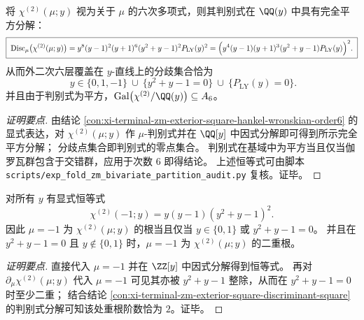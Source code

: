 \begin{conclusion}[外二次判别式的完全平方分解与二阶共振临界集]\label{con:xi-terminal-zm-exterior-square-discriminant-square}
将 \(\chi^{(2)}(\mu;y)\) 视为关于 \(\mu\) 的六次多项式，则其判别式在 \(\QQ(y)\) 中具有完全平方分解：
\[
\boxed{\;
\mathrm{Disc}_{\mu}\bigl(\chi^{(2)}(\mu;y)\bigr)
=y^8(y-1)^2(y+1)^6(y^2+y-1)^2P_{\mathrm{LY}}(y)^2
=\Bigl(y^4(y-1)(y+1)^3(y^2+y-1)P_{\mathrm{LY}}(y)\Bigr)^2.
\;}
\]
从而外二次六层覆盖在 \(y\)-直线上的分歧集合恰为
\[
\boxed{\;y\in\{0,1,-1\}\ \cup\ \{y^2+y-1=0\}\ \cup\ \{P_{\mathrm{LY}}(y)=0\}.}
\]
并且由于判别式为平方，\(\mathrm{Gal}\bigl(\chi^{(2)}/\QQ(y)\bigr)\subseteq A_6\)。
\end{conclusion}
\begin{proof}[证明要点]
由结论 \ref{con:xi-terminal-zm-exterior-square-hankel-wronskian-order6} 的显式表达，对 \(\chi^{(2)}(\mu;y)\) 作 \(\mu\)-判别式并在 \(\QQ[y]\) 中因式分解即可得到所示完全平方分解；
分歧点集合即判别式的零点集合。
判别式在基域中为平方当且仅当伽罗瓦群包含于交错群，应用于次数 \(6\) 即得结论。
上述恒等式可由脚本 \texttt{scripts/exp\_fold\_zm\_bivariate\_partition\_audit.py} 复核。证毕。
\end{proof}

\begin{conclusion}[\texorpdfstring{$\mu=-1$}{mu=-1} 的黄金比共振判别与二重根结构]\label{con:xi-terminal-zm-exterior-square-mu-minus-one-resonance}
对所有 \(y\) 有显式恒等式
\[
\boxed{\;\chi^{(2)}(-1;y)=y(y-1)(y^2+y-1)^2.\;}
\]
因此 \(\mu=-1\) 为 \(\chi^{(2)}(\mu;y)\) 的根当且仅当
\(
y\in\{0,1\}
\)
或
\(
y^2+y-1=0
\)。
并且在 \(y^2+y-1=0\) 且 \(y\notin\{0,1\}\) 时，\(\mu=-1\) 为 \(\chi^{(2)}(\mu;y)\) 的二重根。
\end{conclusion}
\begin{proof}[证明要点]
直接代入 \(\mu=-1\) 并在 \(\ZZ[y]\) 中因式分解得到恒等式。
再对 \(\partial_\mu\chi^{(2)}(\mu;y)\) 代入 \(\mu=-1\) 可见其亦被 \(y^2+y-1\) 整除，从而在 \(y^2+y-1=0\) 时至少二重；
结合结论 \ref{con:xi-terminal-zm-exterior-square-discriminant-square} 的判别式分解可知该处重根阶数恰为 \(2\)。证毕。
\end{proof}

